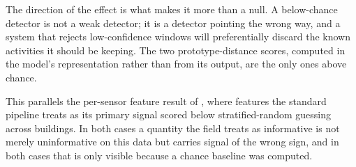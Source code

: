 The direction of the effect is what makes it more than a null. A below-chance detector is
not a weak detector; it is a detector pointing the wrong way, and a system that rejects
low-confidence windows will preferentially discard the known activities it should be
keeping. The two prototype-distance scores, computed in the model's representation rather
than from its output, are the only ones above chance.

This parallels the per-sensor feature result of \cite{kbaier_closedset}, where features
the standard pipeline treats as its primary signal scored below stratified-random guessing
across buildings. In both cases a quantity the field treats as informative is not merely
uninformative on this data but carries signal of the wrong sign, and in both cases that is
only visible because a chance baseline was computed.
